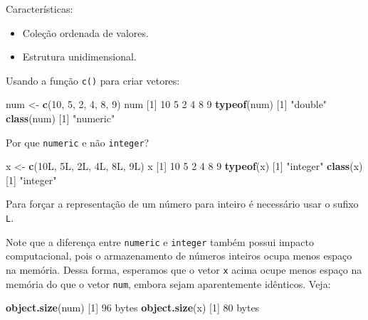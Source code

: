 \documentclass[10pt,a4paper]{book}
\newenvironment{Shaded}{\begin{snugshade}}{\end{snugshade}}
\newcommand{\KeywordTok}[1]{\textcolor[rgb]{0.13,0.29,0.53}{\textbf{#1}}}
\newcommand{\DecValTok}[1]{\textcolor[rgb]{0.00,0.00,0.81}{#1}}
\newcommand{\StringTok}[1]{\textcolor[rgb]{0.31,0.60,0.02}{#1}}
\newcommand{\NormalTok}[1]{#1}
\providecommand{\tightlist}{%
  \setlength{\itemsep}{0pt}\setlength{\parskip}{0pt}}
\begin{document}
Características:

\begin{itemize}
\tightlist
\item
  Coleção ordenada de valores.
\item
  Estrutura unidimensional.
\end{itemize}

Usando a função \texttt{c()} para criar vetores:

\begin{Shaded}
\begin{Highlighting}[]
\NormalTok{num <-}\StringTok{ }\KeywordTok{c}\NormalTok{(}\DecValTok{10}\NormalTok{, }\DecValTok{5}\NormalTok{, }\DecValTok{2}\NormalTok{, }\DecValTok{4}\NormalTok{, }\DecValTok{8}\NormalTok{, }\DecValTok{9}\NormalTok{)}
\NormalTok{num}
\NormalTok{[}\DecValTok{1}\NormalTok{] }\DecValTok{10}  \DecValTok{5}  \DecValTok{2}  \DecValTok{4}  \DecValTok{8}  \DecValTok{9}
\KeywordTok{typeof}\NormalTok{(num)}
\NormalTok{[}\DecValTok{1}\NormalTok{] }\StringTok{"double"}
\KeywordTok{class}\NormalTok{(num)}
\NormalTok{[}\DecValTok{1}\NormalTok{] }\StringTok{"numeric"}
\end{Highlighting}
\end{Shaded}

Por que \texttt{numeric} e não \texttt{integer}?

\begin{Shaded}
\begin{Highlighting}[]
\NormalTok{x <-}\StringTok{ }\KeywordTok{c}\NormalTok{(10L, 5L, 2L, 4L, 8L, 9L)}
\NormalTok{x}
\NormalTok{[}\DecValTok{1}\NormalTok{] }\DecValTok{10}  \DecValTok{5}  \DecValTok{2}  \DecValTok{4}  \DecValTok{8}  \DecValTok{9}
\KeywordTok{typeof}\NormalTok{(x)}
\NormalTok{[}\DecValTok{1}\NormalTok{] }\StringTok{"integer"}
\KeywordTok{class}\NormalTok{(x)}
\NormalTok{[}\DecValTok{1}\NormalTok{] }\StringTok{"integer"}
\end{Highlighting}
\end{Shaded}

Para forçar a representação de um número para inteiro é necessário usar
o sufixo \texttt{L}.

Note que a diferença entre \texttt{numeric} e \texttt{integer} também
possui impacto computacional, pois o armazenamento de números inteiros
ocupa menos espaço na memória. Dessa forma, esperamos que o vetor
\texttt{x} acima ocupe menos espaço na memória do que o vetor
\texttt{num}, embora sejam aparentemente idênticos. Veja:

\begin{Shaded}
\begin{Highlighting}[]
\KeywordTok{object.size}\NormalTok{(num)}
\NormalTok{[}\DecValTok{1}\NormalTok{] }\DecValTok{96}\NormalTok{ bytes}
\KeywordTok{object.size}\NormalTok{(x)}
\NormalTok{[}\DecValTok{1}\NormalTok{] }\DecValTok{80}\NormalTok{ bytes}
\end{Highlighting}
\end{Shaded}
\end{document}
